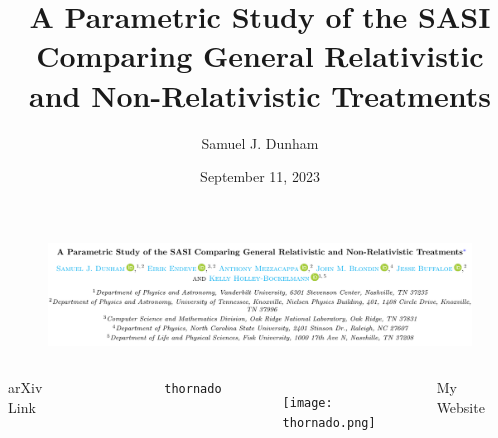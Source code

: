 \documentclass{beamer}
\title[MICRA 2023]{A Parametric Study of the SASI Comparing
General Relativistic and Non-Relativistic Treatments}
\author{Samuel J. Dunham}
\date{September 11, 2023}
\begin{document}
\begin{frame}

  \titlepage

\end{frame}

\begin{frame}

  \begin{figure}[htb!]
    \centering
    \includegraphics[width=\textwidth]{paperTitle.png}
  \end{figure}

  \begin{columns}[c]

      \centerline{arXiv Link}
      \begin{figure}[htb!]
        \centering
        \includegraphics[width=0.5\textwidth]{arxivLink.png}
      \end{figure}
      \centerline{\texttt{thornado}}
      \begin{figure}[htb!]
        \centering
        \texttt{[image: thornado.png]}
      \end{figure}
      \centerline{My Website}
      \begin{figure}[htb!]
        \centering
        \includegraphics[width=0.5\textwidth]{Website.png}
      \end{figure}


\end{columns}
\end{frame}
\end{document}

